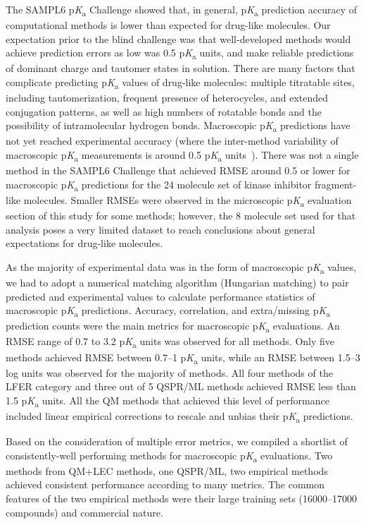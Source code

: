 \documentclass[9pt,lineno,final]{elife}
\newcommand{\pKa}{p\textit{K}\textsubscript{a}}
\begin{document}
The SAMPL6 \pKa{} Challenge showed that, in general, \pKa{} prediction accuracy of computational methods is lower than expected for drug-like molecules. 
Our expectation prior to the blind challenge was that well-developed methods would achieve prediction errors as low was 0.5 \pKa{} units, and make reliable predictions of dominant charge and tautomer states in solution. 
There are many factors that complicate predicting \pKa{} values of drug-like molecules: multiple titratable sites, including tautomerization, frequent presence of heterocycles, and extended conjugation patterns, as well as high numbers of rotatable bonds and the possibility of intramolecular hydrogen bonds.
Macroscopic \pKa{} predictions have not yet reached experimental accuracy (where the inter-method variability of macroscopic \pKa{} measurements is around 0.5 \pKa{} units~\citep{Fraczkiewicz:2013:ReferenceModuleinChemistryMolecularSciencesandChemicalEngineering}). 
There was not a single method in the SAMPL6 Challenge that achieved RMSE around 0.5 or lower for macroscopic \pKa{} predictions for the 24 molecule set of kinase inhibitor fragment-like molecules.
Smaller RMSEs were observed in the microscopic \pKa{} evaluation section of this study for some methods; however, the 8 molecule set used for that analysis poses a very limited dataset to reach conclusions about general expectations for drug-like molecules.

As the majority of experimental data was in the form of macroscopic \pKa{} values, we had to adopt a numerical matching algorithm (Hungarian matching) to pair predicted and experimental values to calculate performance statistics of macroscopic \pKa{} predictions. 
Accuracy, correlation, and extra/missing \pKa{} prediction counts were the main metrics for macroscopic \pKa{} evaluations. 
An RMSE range of 0.7 to 3.2 \pKa{} units was observed for all methods.
Only five methods achieved RMSE between 0.7--1 \pKa{} units, while an RMSE between 1.5--3 log units was observed for the majority of methods. 
All four methods of the LFER category and three out of 5 QSPR/ML methods achieved RMSE less than 1.5 \pKa{} units.
All the QM methods that achieved this level of performance included linear empirical corrections to rescale and unbias their \pKa{} predictions. 

Based on the consideration of multiple error metrics, we compiled a shortlist of consistently-well performing methods for macroscopic \pKa{} evaluations. 
Two methods from QM+LEC methods, one QSPR/ML, two empirical methods achieved consistent performance according to many metrics. 
The common features of the two empirical methods were their large training sets (16000--17000 compounds) and commercial nature.
\end{document}
